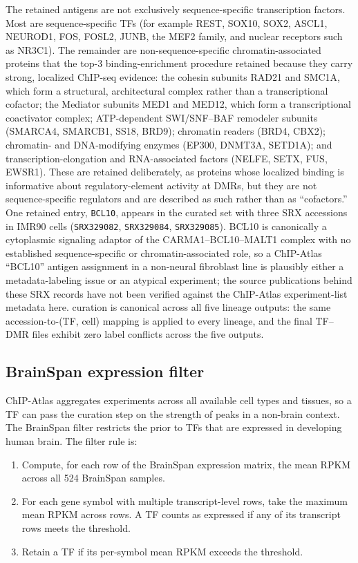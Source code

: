 \documentclass[sigconf,nonacm]{acmart}
\begin{document}
The retained antigens are not exclusively sequence-specific
transcription factors. Most are sequence-specific TFs (for example
REST, SOX10, SOX2, ASCL1, NEUROD1, FOS, FOSL2, JUNB, the MEF2
family, and nuclear receptors such as NR3C1). The remainder are non-sequence-specific chromatin-associated
proteins that the top-3 binding-enrichment procedure
retained because they carry strong, localized ChIP-seq evidence: the
cohesin
subunits RAD21 and SMC1A, which form a structural, architectural
complex rather than a transcriptional cofactor; the Mediator
subunits MED1 and MED12, which form a transcriptional coactivator
complex; ATP-dependent SWI/SNF--BAF remodeler subunits (SMARCA4,
SMARCB1, SS18, BRD9); chromatin readers (BRD4, CBX2); chromatin- and
DNA-modifying enzymes (EP300, DNMT3A, SETD1A); and
transcription-elongation and RNA-associated factors (NELFE, SETX,
FUS, EWSR1). These are retained deliberately, as proteins whose
localized binding is informative about regulatory-element activity
at DMRs, but they are not sequence-specific regulators and are
described as such rather than as ``cofactors.'' One retained entry,
\texttt{BCL10}, appears in the curated set with three SRX accessions
in IMR90 cells (\texttt{SRX329082}, \texttt{SRX329084},
\texttt{SRX329085}). BCL10 is canonically a cytoplasmic signaling
adaptor of the CARMA1--BCL10--MALT1 complex with no established
sequence-specific or chromatin-associated role, so a ChIP-Atlas
``BCL10'' antigen assignment in a non-neural fibroblast line is
plausibly either a metadata-labeling issue or an atypical experiment;
the source publications behind these SRX records have not been
verified against the ChIP-Atlas experiment-list metadata here.
curation is canonical across all five lineage outputs: the same
accession-to-(TF, cell) mapping is applied to every lineage, and the
final TF--DMR files exhibit zero label conflicts across the five
outputs.

\subsection{BrainSpan expression filter}
\label{sec:framework:brainspan}

ChIP-Atlas aggregates experiments across all available cell types and
tissues, so a TF can pass the curation step on the strength of
peaks in a non-brain context. The BrainSpan filter restricts the
prior to TFs that are expressed in developing human brain. The
filter rule is:
\begin{enumerate}
  \item Compute, for each row of the BrainSpan expression matrix,
        the mean RPKM across all 524 BrainSpan samples.
  \item For each gene symbol with multiple transcript-level rows,
        take the maximum mean RPKM across rows. A TF counts as
        expressed if any of its transcript rows meets the threshold.
  \item Retain a TF if its per-symbol mean RPKM exceeds the
        threshold.
\end{enumerate}
\end{document}
